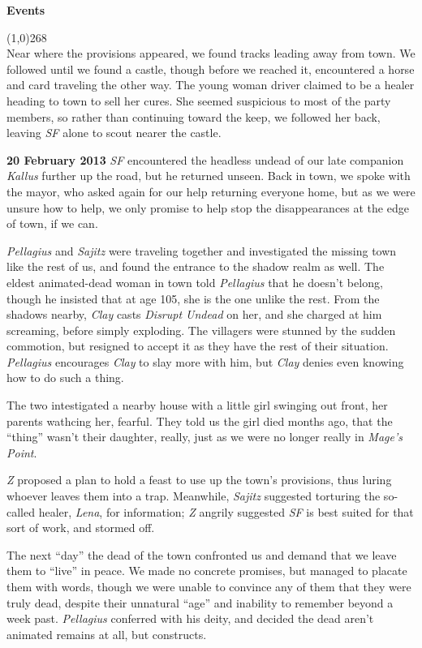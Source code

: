 \documentclass[letterpaper]{article}
\newcommand{\colline}{\line(1,0){268} \\}
\newcommand{\e}[1]{\emph{#1}}
\newcommand{\B}[1]{\textbf{#1}}
\newenvironment{notesection}[1]
{ {\huge \B{#1}} \par
\vspace{-0.75em}
\colline
\begingroup\fontsize{9pt}{12pt}\selectfont}
{\endgroup}
\begin{document}
\begin{notesection}{Events}
Near where the provisions appeared, we found tracks leading away from town.  We followed until we found a castle, though before we reached it, encountered a horse and card traveling the other way.  The young woman driver claimed to be a healer heading to town to sell her cures.  She seemed suspicious to most of the party members, so rather than continuing toward the keep, we followed her back, leaving \e{SF} alone to scout nearer the castle.


\B{20 February 2013} \e{SF} encountered the headless undead of our late companion \e{Kallus} further up the road, but he returned unseen.  Back in town, we spoke with the mayor, who asked again for our help returning everyone home, but as we were unsure how to help, we only promise to help stop the disappearances at the edge of town, if we can.

\e{Pellagius} and \e{Sajitz} were traveling together and investigated the missing town like the rest of us, and found the entrance to the shadow realm as well.  The eldest animated-dead woman in town told \e{Pellagius} that he doesn't belong, though he insisted that at age 105, she is the one unlike the rest.  From the shadows nearby, \e{Clay} casts \e{Disrupt Undead} on her, and she charged at him screaming, before simply exploding.  The villagers were stunned by the sudden commotion, but resigned to accept it as they have the rest of their situation.  \e{Pellagius} encourages \e{Clay} to slay more with him, but \e{Clay} denies even knowing how to do such a thing.

The two intestigated a nearby house with a little girl swinging out front, her parents wathcing her, fearful. They told us the girl died months ago, that the ``thing'' wasn't their daughter, really, just as we were no longer really in \e{Mage's Point}.

\e{Z} proposed a plan to hold a feast to use up the town's provisions, thus luring whoever leaves them into a trap.  Meanwhile, \e{Sajitz} suggested torturing the so-called healer, \e{Lena}, for information; \e{Z} angrily suggested \e{SF} is best suited for that sort of work, and stormed off.

The next ``day'' the dead of the town confronted us and demand that we leave them to ``live'' in peace.  We made no concrete promises, but managed to placate them with words, though we were unable to convince any of them that they were truly dead, despite their unnatural ``age'' and inability to remember beyond a week past.  \e{Pellagius} conferred with his deity, and decided the dead aren't animated remains at all, but constructs.


\end{notesection}
\end{document}
